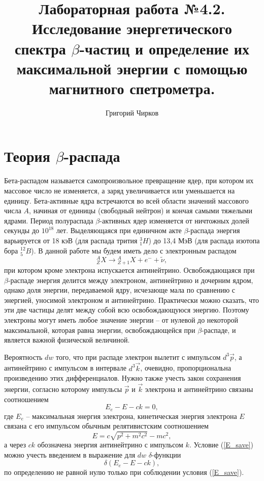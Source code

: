 \documentclass[12pt,a4paper]{article}
\author{Григорий Чирков}
\title{Лабораторная работа №4.2. Исследование энергетического спектра $\beta$-частиц и определение их максимальной энергии с помощью магнитного спетрометра.}
\begin{document}
\maketitle

\section{Теория $\beta$-распада}
Бета-распадом называется самопроизвольное превращение ядер, при котором их массовое число не изменяется, а заряд увеличивается или уменьшается на единицу. Бета-активные ядра встречаются во всей области значений массового числа $A$, начиная от единицы (свободный нейтрон) и кончая самыми тяжелыми ядрами. Период полураспада $\beta$-активных ядер изменяется от ничтожных долей секунды до $10^{18}$ лет. Выделяющаяся при единичном акте $\beta$-распада энергия варьируется от 18 кэВ (для распада трития ${}_1^3H$) до 13,4 МэВ (для распада изотопа бора ${}_5^{12}B$).
В данной работе мы будем иметь дело с электронным распадом 
\begin{equation*}
{}_Z^AX \longrightarrow {}_{Z+1}^AX + e^{-} + \tilde \nu,
\end{equation*}
при котором кроме электрона испускается антинейтрино. Освобождающаяся при $\beta$-распаде энергия делится между электроном, антинейтрино и дочерним ядром, однако доля энергии, передаваемой ядру, исчезающе мала по сравнению с энергией, уносимой электроном и антинейтрино. Практически можно сказать, что эти две частицы делят между собой всю освобождающуюся энергию. Поэтому электроны могут иметь любое значение энергии -- от нулевой до некоторой максимальной, которая равна энергии, освобождающейся при $\beta$-распаде, и является важной физической величиной. 

Вероятность $dw$ того, что при распаде электрон вылетит с импульсом $d^3 \vec{p}$, а антинейтрино с импульсом в интервале $d^3 \vec{k}$, очевидно, пропорциональна произведению этих дифференциалов. Нужно также учесть закон сохранения энергии, согласно которому импульсы $\vec{p}$ и $\vec{k}$ электрона и антинейтрино связаны соотношением 
\begin{equation} \label{E_save}
E_e - E - ck = 0,
\end{equation}
где $E_e$ -- максимальная энергия электрона, кинетическая энергия электрона $E$ связана с его импульсом обычным релятивистским соотношением 
\begin{equation}
E = c \sqrt{p^2 + m^2 c^2} - m c^2, 
\end{equation}
а через $ck$ обозначена энергия антинейтрино с импульсом $k$. Условие (\ref{E_save}) можно учесть введением в выражение для $dw$ $\delta$-функции
\begin{equation}
\delta (E_e - E - ck), 
\end{equation}
по определению не равной нулю только при соблюдении условия (\ref{E_save}).
\end{document}
